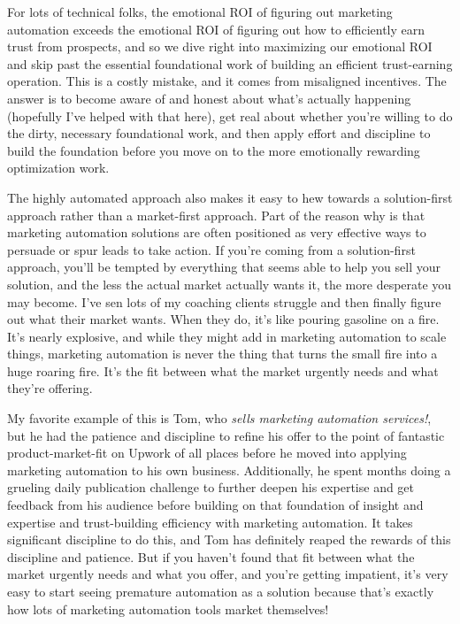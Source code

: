 For lots of technical folks, the emotional ROI of figuring out marketing automation exceeds the emotional ROI of figuring out how to efficiently earn trust from prospects, and so we dive right into maximizing our emotional ROI and skip past the essential foundational work of building an efficient trust-earning operation. This is a costly mistake, and it comes from misaligned incentives. The answer is to become aware of and honest about what's actually happening (hopefully I've helped with that here), get real about whether you're willing to do the dirty, necessary foundational work, and then apply effort and discipline to build the foundation before you move on to the more emotionally rewarding optimization work.

The highly automated approach also makes it easy to hew towards a solution-first approach rather than a market-first approach. Part of the reason why is that marketing automation solutions are often positioned as very effective ways to persuade or spur leads to take action. If you're coming from a solution-first approach, you'll be tempted by everything that seems able to help you sell your solution, and the less the actual market actually wants it, the more desperate you may become. I've sen lots of my coaching clients struggle and then finally figure out what their market wants. When they do, it's like pouring gasoline on a fire. It's nearly explosive, and while they might add in marketing automation to scale things, marketing automation is never the thing that turns the small fire into a huge roaring fire. It's the fit between what the market urgently needs and what they're offering.

My favorite example of this is Tom, who \emph{sells marketing automation services!}, but he had the patience and discipline to refine his offer to the point of fantastic product-market-fit on Upwork of all places before he moved into applying marketing automation to his own business. Additionally, he spent months doing a grueling daily publication challenge to further deepen his expertise and get feedback from his audience before building on that foundation of insight and expertise and trust-building efficiency with marketing automation. It takes significant discipline to do this, and Tom has definitely reaped the rewards of this discipline and patience. But if you haven't found that fit between what the market urgently needs and what you offer, and you're getting impatient, it's very easy to start seeing premature automation as a solution because that's exactly how lots of marketing automation tools market themselves!

